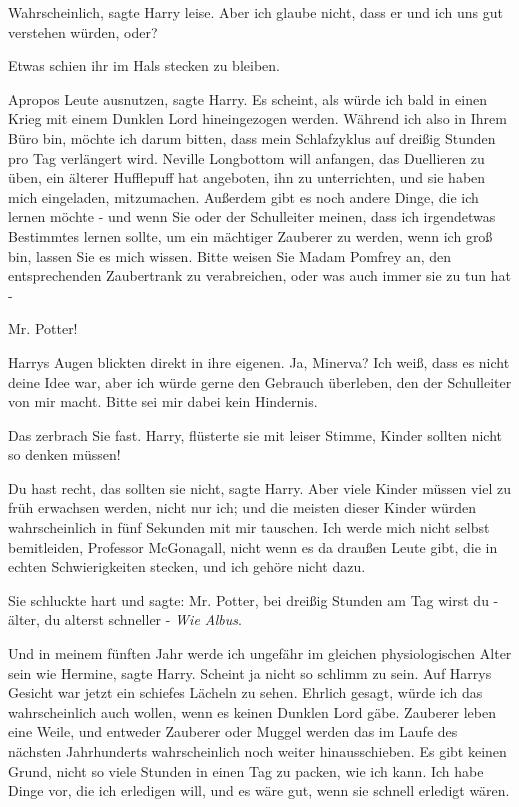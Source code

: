 \glqq{}Wahrscheinlich\grqq{}, sagte Harry leise. \glqq{}Aber ich glaube nicht,
dass er und ich uns gut verstehen würden, oder?\grqq{}

Etwas schien ihr im Hals stecken zu bleiben.

\glqq{}Apropos Leute ausnutzen\grqq{}, sagte Harry. \glqq{}Es scheint, als würde
ich bald in einen Krieg mit einem Dunklen Lord hineingezogen werden. Während ich
also in Ihrem Büro bin, möchte ich darum bitten, dass mein Schlafzyklus auf
dreißig Stunden pro Tag verlängert wird. Neville Longbottom will anfangen, das
Duellieren zu üben, ein älterer Hufflepuff hat angeboten, ihn zu unterrichten,
und sie haben mich eingeladen, mitzumachen. Außerdem gibt es noch andere Dinge,
die ich lernen möchte - und wenn Sie oder der Schulleiter meinen, dass ich
irgendetwas Bestimmtes lernen sollte, um ein mächtiger Zauberer zu werden, wenn
ich groß bin, lassen Sie es mich wissen. Bitte weisen Sie Madam Pomfrey an, den
entsprechenden Zaubertrank zu verabreichen, oder was auch immer sie zu tun hat
-\grqq{}

\glqq{}Mr. Potter!\grqq{}

Harrys Augen blickten direkt in ihre eigenen. \glqq{}Ja, Minerva? Ich weiß, dass
es nicht deine Idee war, aber ich würde gerne den Gebrauch überleben, den der
Schulleiter von mir macht. Bitte sei mir dabei kein Hindernis.\grqq{}

Das zerbrach Sie fast. \glqq{}Harry\grqq{}, flüsterte sie mit leiser Stimme,
\glqq{}Kinder sollten nicht so denken müssen!\grqq{}

\glqq{}Du hast recht, das sollten sie nicht\grqq{}, sagte Harry. \glqq{}Aber viele
Kinder müssen viel zu früh erwachsen werden, nicht nur ich; und die meisten
dieser Kinder würden wahrscheinlich in fünf Sekunden mit mir tauschen. Ich werde
mich nicht selbst bemitleiden, Professor McGonagall, nicht wenn es da draußen
Leute gibt, die in echten Schwierigkeiten stecken, und ich gehöre nicht
dazu.\grqq{}

Sie schluckte hart und sagte: \glqq{}Mr. Potter, bei dreißig Stunden am Tag wirst
du - älter, du alterst schneller -\grqq{} \emph{Wie Albus}.

\glqq{}Und in meinem fünften Jahr werde ich ungefähr im gleichen physiologischen
Alter sein wie Hermine\grqq{}, sagte Harry. \glqq{}Scheint ja nicht so schlimm zu
sein.\grqq{} Auf Harrys Gesicht war jetzt ein schiefes Lächeln zu sehen. \glqq{}
Ehrlich gesagt, würde ich das wahrscheinlich auch wollen, wenn es keinen Dunklen
Lord gäbe. Zauberer leben eine Weile, und entweder Zauberer oder Muggel werden
das im Laufe des nächsten Jahrhunderts wahrscheinlich noch weiter
hinausschieben. Es gibt keinen Grund, nicht so viele Stunden in einen Tag zu
packen, wie ich kann. Ich habe Dinge vor, die ich erledigen will, und es wäre
gut, wenn sie schnell erledigt wären.\grqq{}


